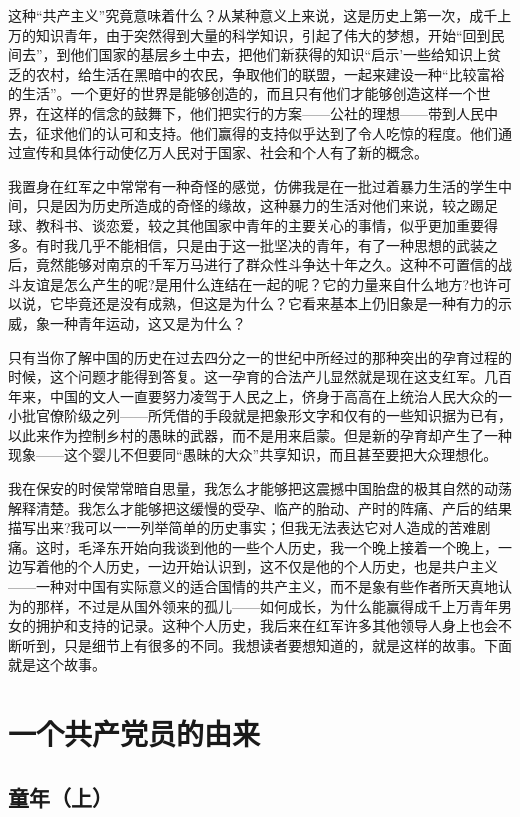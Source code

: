\documentclass[10pt]{book}
\begin{document}
这种“共产主义”究竟意味着什么？从某种意义上来说，这是历史上第一次，成千上万的知识青年，由于突然得到大量的科学知识，引起了伟大的梦想，开始“回到民间去”，到他们国家的基层乡土中去，把他们新获得的知识“启示’一些给知识上贫乏的农村，给生活在黑暗中的农民，争取他们的联盟，一起来建设一种“比较富裕的生活”。一个更好的世界是能够创造的，而且只有他们才能够创造这样一个世界，在这样的信念的鼓舞下，他们把实行的方案——公社的理想——带到人民中去，征求他们的认可和支持。他们赢得的支持似乎达到了令人吃惊的程度。他们通过宣传和具体行动使亿万人民对于国家、社会和个人有了新的概念。

我置身在红军之中常常有一种奇怪的感觉，仿佛我是在一批过着暴力生活的学生中间，只是因为历史所造成的奇怪的缘故，这种暴力的生活对他们来说，较之踢足球、教科书、谈恋爱，较之其他国家中青年的主要关心的事情，似乎更加重要得多。有时我几乎不能相信，只是由于这一批坚决的青年，有了一种思想的武装之后，竟然能够对南京的千军万马进行了群众性斗争达十年之久。这种不可置信的战斗友谊是怎么产生的呢?是用什么连结在一起的呢？它的力量来自什么地方?也许可以说，它毕竟还是没有成熟，但这是为什么？它看来基本上仍旧象是一种有力的示威，象一种青年运动，这又是为什么？

只有当你了解中国的历史在过去四分之一的世纪中所经过的那种突出的孕育过程的时候，这个问题才能得到答复。这一孕育的合法产儿显然就是现在这支红军。几百年来，中国的文人一直要努力凌驾于人民之上，侪身于高高在上统治人民大众的一小批官僚阶级之列——所凭借的手段就是把象形文字和仅有的一些知识据为已有，以此来作为控制乡村的愚昧的武器，而不是用来启蒙。但是新的孕育却产生了一种现象——这个婴儿不但要同“愚昧的大众”共享知识，而且甚至要把大众理想化。

我在保安的时侯常常暗自思量，我怎么才能够把这震撼中国胎盘的极其自然的动荡解释清楚。我怎么才能够把这缓慢的受孕、临产的胎动、产时的阵痛、产后的结果描写出来?我可以一一列举简单的历史事实；但我无法表达它对人造成的苦难剧痛。这时，毛泽东开始向我谈到他的一些个人历史，我一个晚上接着一个晚上，一边写着他的个人历史，一边开始认识到，这不仅是他的个人历史，也是共户主义——一种对中国有实际意义的适合国情的共产主义，而不是象有些作者所天真地认为的那样，不过是从国外领来的孤儿——如何成长，为什么能赢得成千上万青年男女的拥护和支持的记录。这种个人历史，我后来在红军许多其他领导人身上也会不断听到，只是细节上有很多的不同。我想读者要想知道的，就是这样的故事。下面就是这个故事。

\chapter{一个共产党员的由来}

\section{童年（上）}
\end{document}
